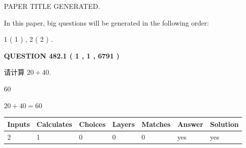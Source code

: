 \documentclass{ctexart}
\begin{document}
   
 \vspace{0.2in}
 
 
 
 
   
   
 PAPER TITLE GENERATED.
   
   
   
\vspace{0.2in}
   
In this paper, big questions will be generated in the following order: 
   
   
   1 ( 1 )
 ,
   2 ( 2 )
 .
  
\vspace{0.2in}
  
{\textbf{\Large{QUESTION
482.1 
 ( 1 , 1 , 6791 )
}}}
  
  
 
请计算 $ %
20 +  %
40 $.
 
 
 
\noindent{}
 
 

60
 
 
\noindent{}
 
 

 
 
 
\noindent{}
 
 

$ %
20 +  %
40=   %
60$
 
 
\noindent{}
 
 

 
   
   
   
   
\noindent\begin{tabular}{|l|l|l|l|l|l|l|}
 \hline
Inputs & Calculates & Choices & Layers & Matches & Answer & Solution \\ \hline
 2  & 
 1  & 
 0
  & 
 0  & 
 0  & 
  yes & 
  yes 
  \\ \hline
 \end{tabular}
   
   
   
   
\noindent{}
   
   
  
\end{document}
